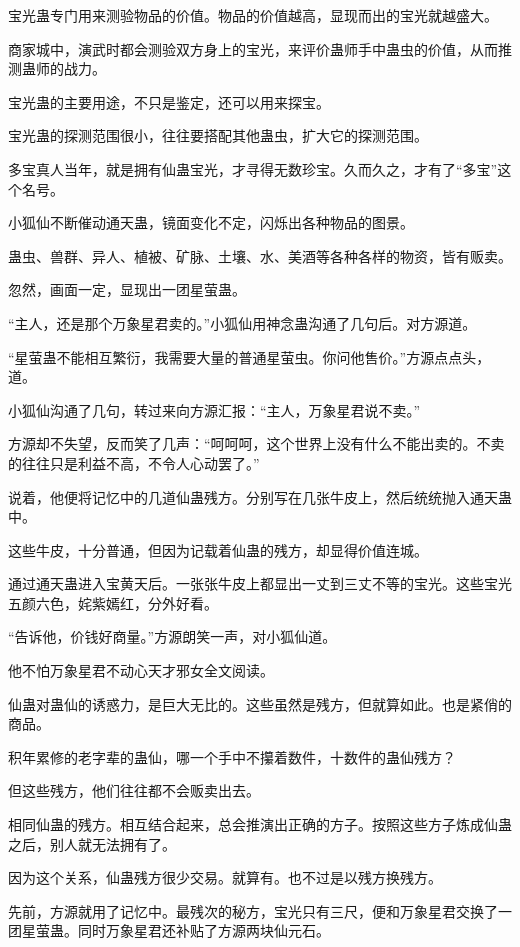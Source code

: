 \begin{this_body}
宝光蛊专门用来测验物品的价值。物品的价值越高，显现而出的宝光就越盛大。

商家城中，演武时都会测验双方身上的宝光，来评价蛊师手中蛊虫的价值，从而推测蛊师的战力。

宝光蛊的主要用途，不只是鉴定，还可以用来探宝。

宝光蛊的探测范围很小，往往要搭配其他蛊虫，扩大它的探测范围。

多宝真人当年，就是拥有仙蛊宝光，才寻得无数珍宝。久而久之，才有了“多宝”这个名号。

小狐仙不断催动通天蛊，镜面变化不定，闪烁出各种物品的图景。

蛊虫、兽群、异人、植被、矿脉、土壤、水、美酒等各种各样的物资，皆有贩卖。

忽然，画面一定，显现出一团星萤蛊。

“主人，还是那个万象星君卖的。”小狐仙用神念蛊沟通了几句后。对方源道。

“星萤蛊不能相互繁衍，我需要大量的普通星萤虫。你问他售价。”方源点点头，道。

小狐仙沟通了几句，转过来向方源汇报：“主人，万象星君说不卖。”

方源却不失望，反而笑了几声：“呵呵呵，这个世界上没有什么不能出卖的。不卖的往往只是利益不高，不令人心动罢了。”

说着，他便将记忆中的几道仙蛊残方。分别写在几张牛皮上，然后统统抛入通天蛊中。

这些牛皮，十分普通，但因为记载着仙蛊的残方，却显得价值连城。

通过通天蛊进入宝黄天后。一张张牛皮上都显出一丈到三丈不等的宝光。这些宝光五颜六色，姹紫嫣红，分外好看。

“告诉他，价钱好商量。”方源朗笑一声，对小狐仙道。

他不怕万象星君不动心天才邪女全文阅读。

仙蛊对蛊仙的诱惑力，是巨大无比的。这些虽然是残方，但就算如此。也是紧俏的商品。

积年累修的老字辈的蛊仙，哪一个手中不攥着数件，十数件的蛊仙残方？

但这些残方，他们往往都不会贩卖出去。

相同仙蛊的残方。相互结合起来，总会推演出正确的方子。按照这些方子炼成仙蛊之后，别人就无法拥有了。

因为这个关系，仙蛊残方很少交易。就算有。也不过是以残方换残方。

先前，方源就用了记忆中。最残次的秘方，宝光只有三尺，便和万象星君交换了一团星萤蛊。同时万象星君还补贴了方源两块仙元石。


\end{this_body}

